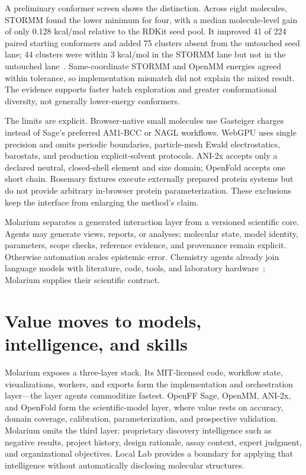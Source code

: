 \documentclass[10pt]{article}
\begin{document}
A preliminary conformer screen shows the distinction.
Across eight molecules, STORMM found the lower minimum for four, with a median molecule-level gain of only 0.128 kcal/mol relative to the RDKit seed pool.
It improved 41 of 224 paired starting conformers and added 75 clusters absent from the untouched seed lane; 44 clusters were within 3 kcal/mol in the STORMM lane but not in the untouched lane~\cite{molarium2026}.
Same-coordinate STORMM and OpenMM energies agreed within tolerance, so implementation mismatch did not explain the mixed result.
The evidence supports faster batch exploration and greater conformational diversity, not generally lower-energy conformers.

The limits are explicit.
Browser-native small molecules use Gasteiger charges instead of Sage's preferred AM1-BCC or NAGL workflows.
WebGPU uses single precision and omits periodic boundaries, particle-mesh Ewald electrostatics, barostats, and production explicit-solvent protocols.
ANI-2x accepts only a declared neutral, closed-shell element and size domain; OpenFold accepts one short chain.
Rosemary fixtures execute externally prepared protein systems but do not provide arbitrary in-browser protein parameterization.
These exclusions keep the interface from enlarging the method's claim.

Molarium separates a generated interaction layer from a versioned scientific core.
Agents may generate views, reports, or analyses; molecular state, model identity, parameters, scope checks, reference evidence, and provenance remain explicit.
Otherwise automation scales epistemic error.
Chemistry agents already join language models with literature, code, tools, and laboratory hardware~\cite{bran2024chemcrow,boiko2023coscientist}; Molarium supplies their scientific contract.

\section*{Value moves to models, intelligence, and skills}

Molarium exposes a three-layer stack.
Its MIT-licensed code, workflow state, visualizations, workers, and exports form the implementation and orchestration layer---the layer agents commoditize fastest.
OpenFF Sage, OpenMM, ANI-2x, and OpenFold form the scientific-model layer, where value rests on accuracy, domain coverage, calibration, parameterization, and prospective validation.
Molarium omits the third layer: proprietary discovery intelligence such as negative results, project history, design rationale, assay context, expert judgment, and organizational objectives.
Local Lab provides a boundary for applying that intelligence without automatically disclosing molecular structures.
\end{document}
